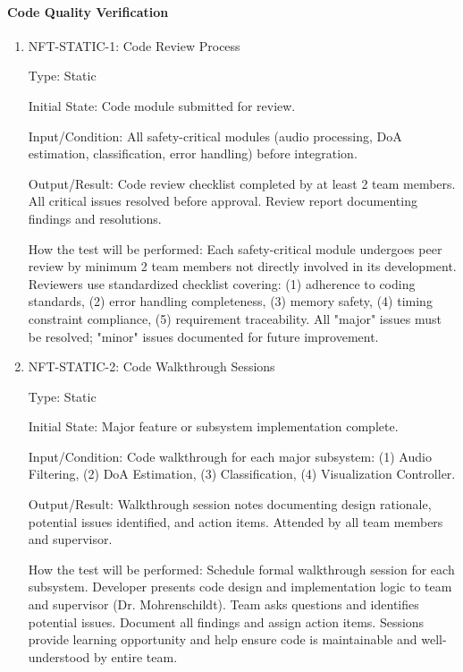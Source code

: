 \documentclass[12pt, titlepage]{article}
\begin{document}
\paragraph{Code Quality Verification}

\begin{enumerate}

\item{NFT-STATIC-1: Code Review Process\\}

Type: Static

Initial State: Code module submitted for review.

Input/Condition: All safety-critical modules (audio processing, DoA estimation,
classification, error handling) before integration.

Output/Result: Code review checklist completed by at least 2 team members.
All critical issues resolved before approval. Review report documenting findings
and resolutions.

How the test will be performed: Each safety-critical module undergoes peer review by
minimum 2 team members not directly involved in its development. Reviewers use
standardized checklist covering: (1) adherence to coding standards, (2) error
handling completeness, (3) memory safety, (4) timing constraint compliance, (5)
requirement traceability. All "major" issues must be resolved; "minor" issues
documented for future improvement.

\item{NFT-STATIC-2: Code Walkthrough Sessions\\}

Type: Static

Initial State: Major feature or subsystem implementation complete.

Input/Condition: Code walkthrough for each major subsystem: (1) Audio Filtering,
(2) DoA Estimation, (3) Classification, (4) Visualization Controller.

Output/Result: Walkthrough session notes documenting design rationale, potential
issues identified, and action items. Attended by all team members and supervisor.

How the test will be performed: Schedule formal walkthrough session for each
subsystem. Developer presents code design and implementation logic to team and
supervisor (Dr. Mohrenschildt). Team asks questions and identifies potential
issues. Document all findings and assign action items. Sessions provide learning
opportunity and help ensure code is maintainable and well-understood by entire
team.


\end{enumerate}
\end{document}
